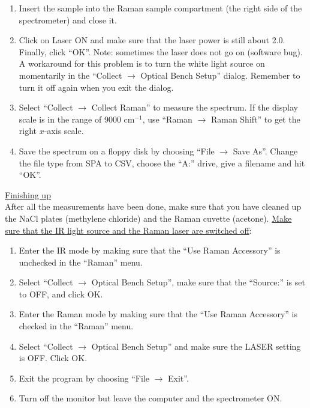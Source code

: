 \documentclass[byrevtex,amssymb,aps,pra,floatfix,letterpaper]{revtex4}
\begin{document}
\begin{enumerate}
\item Insert the sample into the Raman sample compartment (the right side of the spectrometer) and close it.

\item Click on Laser ON and make sure that the laser power is still about 2.0. Finally, click ``OK''. Note: sometimes the laser does not go on (software bug). A workaround for this problem is to turn the white light source on momentarily in the ``Collect $\to$ Optical Bench Setup'' dialog. Remember to turn it off again when you exit the dialog.

\item Select ``Collect $\to$ Collect Raman'' to measure the spectrum. If the display scale is in the range of 9000 cm$^{-1}$, use ``Raman $\to$ Raman Shift'' to get the right $x$-axis scale.

\item Save the spectrum on a floppy disk by choosing ``File $\to$ Save As''. Change the file type from SPA to CSV, choose the ``A:'' drive, give a filename and hit ``OK''.
\end{enumerate}

\noindent
\underline{Finishing up}\\

After all the measurements have been done, make sure that you have cleaned up the NaCl plates (methylene chloride) and the Raman cuvette (acetone). \underline{Make sure that the IR light source and the Raman laser are switched off}:\\

\begin{enumerate}
\item Enter the IR mode by making sure that the ``Use Raman Accessory'' is unchecked in the ``Raman'' menu.

\item Select ``Collect $\to$ Optical Bench Setup'', make sure that the ``Source:'' is set to OFF, and click OK.

\item Enter the Raman mode by making sure that the ``Use Raman Accessory'' is checked in the ``Raman'' menu.

\item Select ``Collect $\to$ Optical Bench Setup'' and make sure the LASER setting is OFF. Click OK.

\item Exit the program by choosing ``File $\to$ Exit''.

\item Turn off the monitor but leave the computer and the spectrometer ON.
\end{enumerate}
\end{document}
